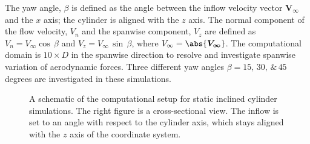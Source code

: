 The yaw angle, $\beta$ is defined as the angle between the inflow velocity
vector $\boldsymbol{V_\infty}$ and the $x$ axis; the cylinder is aligned with
the $z$ axis. The normal component of the flow velocity, $V_n$ and the spanwise
component, $V_z$ are defined as $V_n=V_\infty \cos\,\beta$ and $V_z = V_\infty
\,\sin\,\beta$, where $V_\infty=\abs{\boldsymbol{V_\infty}}$. The computational
domain is $10\times D$ in the spanwise direction to resolve and investigate 
spanwise variation of aerodynamic forces.
Three different yaw angles $\beta=15,\,30,\,\&\,45$ degrees are investigated
in these simulations.
%
\begin{figure}[htb!]
  \caption{A schematic of the computational setup for static inclined cylinder
    simulations. The right figure is a cross-sectional view.  The inflow is set
    to an angle with respect to the cylinder axis, which stays aligned with the $z$
    axis of the coordinate system.}
  \label{fig:yawedModel}
\end{figure}


